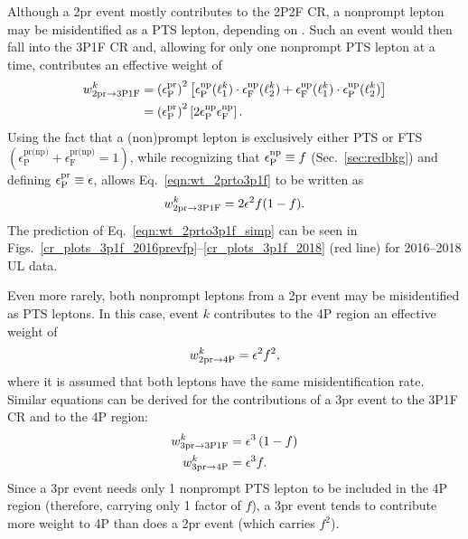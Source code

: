 Although a 2pr event mostly contributes to the 2P2F CR, a nonprompt lepton may be misidentified as a PTS lepton, depending on \effnppass.
Such an event would then fall into the 3P1F CR and, allowing for only one nonprompt PTS lepton at a time, contributes an effective weight of
\begin{align}
	\label{eqn:wt_2prto3p1f}
	w_{\text{2pr} \to \text{3P1F}}^k
	&= \left( \epsilon^\text{pr}_\text{P} \right)^2 
	\left[
		\epsilon^\text{np}_\text{P}(\ell_1^k) \cdot \epsilon^\text{np}_\text{F}(\ell_2^k) + \epsilon^\text{np}_\text{F}(\ell_1^k) \cdot \epsilon^\text{np}_\text{P}(\ell_2^k)
	\right]
	\notag
	\\
	&= \left( \epsilon^\text{pr}_\text{P} \right)^2
	\left[
		2 \epsilon^\text{np}_\text{P} \epsilon^\text{np}_\text{F}
	\right].
\end{align}
Using the fact that a (non)prompt lepton is exclusively either PTS or FTS
$\left( \epsilon^\text{pr(np)}_\text{P} + \epsilon^\text{pr(np)}_\text{F} = 1 \right)$,
while recognizing that $\epsilon^\text{np}_\text{P} \equiv f$ (Sec.~\ref{sec:redbkg}) and defining $\epsilon^\text{pr}_\text{P} \equiv \epsilon$,
allows Eq.~\ref{eqn:wt_2prto3p1f} to be written as
\begin{equation}
	\label{eqn:wt_2prto3p1f_simp}
	w_{\text{2pr} \to \text{3P1F}}^k = 2 \epsilon^2 f (1-f).
\end{equation}
The prediction of Eq.~\ref{eqn:wt_2prto3p1f_simp} can be seen in Figs.~\ref{cr_plots_3p1f_2016prevfp}--\ref{cr_plots_3p1f_2018} (red line) for 2016--2018 UL data.

Even more rarely, both nonprompt leptons from a 2pr event may be misidentified as PTS leptons.
In this case, event $k$ contributes to the 4P region an effective weight of
\begin{equation}
	\label{eqn:wt_2prto4p}
	w_{\text{2pr} \to \text{4P}}^k = \epsilon^2 f^2,
\end{equation}
where it is assumed that both leptons have the same misidentification rate.
Similar equations can be derived for the contributions of a 3pr event to the 3P1F CR and to the 4P region:
\begin{align}
	\label{eqn:wt_3prto3p1f}
	w_{\text{3pr} \to \text{3P1F}}^k &= \epsilon^3 \left( 1-f \right)
	\\
	\label{eqn:wt_3prto4p}
	w_{\text{3pr} \to \text{4P}}^k &= \epsilon^3 f.
\end{align}
Since a 3pr event needs only 1 nonprompt PTS lepton to be included in the 4P region (therefore, carrying only 1 factor of $f$), a 3pr event tends to contribute more weight to 4P than does a 2pr event (which carries $f^2$).

